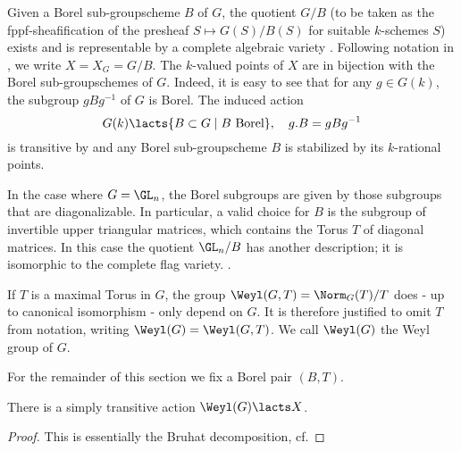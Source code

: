 
Given a Borel sub-groupscheme $B$ of $G$, the quotient $G/B$ (to be taken as 
the fppf-sheafification  of the presheaf $S \mapsto G(S)/B(S)$ for 
suitable $k$-schemes $S$) exists and is representable by a complete algebraic
variety . Following notation in \cite{delignelusztig1976}, we write 
$X = X_G = G/B$. The $k$-valued points of $X$ are in bijection with the 
Borel sub-groupschemes of $G$. Indeed, it is easy to see that for any $g \in G(k)$,
the subgroup $g B g^{-1}$ of $G$ is Borel. The induced action
\begin{equation*}
  G(k) \lacts \{B \subset G \mid B \text{ Borel}\}, \quad g.B = gBg^{-1}
\end{equation*}
is transitive by  and any Borel sub-groupscheme $B$ is
stabilized by its $k$-rational points. 

\begin{rmk} 
  In the case where $G = \GL_n$, the Borel subgroups are given by those subgroups
  that are diagonalizable. In particular, a valid choice for $B$
  is the subgroup of invertible upper triangular matrices, which contains the 
  Torus $T$ of diagonal matrices. In this case the quotient $\GL_n/B$ has
  another description; it is isomorphic to the complete flag variety. 
  .
\end{rmk}

\begin{defi}\label{def:WeylGrp}
  If $T$ is a maximal Torus in $G$, the group $\Weyl(G,T) = \Norm_G(T)/T$ does - up to
  canonical isomorphism - only depend on $G$. It is therefore justified to omit
  $T$ from notation, writing $\Weyl(G) = \Weyl(G,T)$. We call $\Weyl(G)$ the
  Weyl group of $G$.
\end{defi}

For the remainder of this section we fix a Borel pair $(B,T)$. 

\begin{prop}\label{prop:WeylGroupActsOnBorel}
  There is a simply transitive action $\Weyl(G) \lacts X$. 
\begin{proof}
  This is essentially the Bruhat decomposition, cf. 
\end{proof}
\end{prop}

